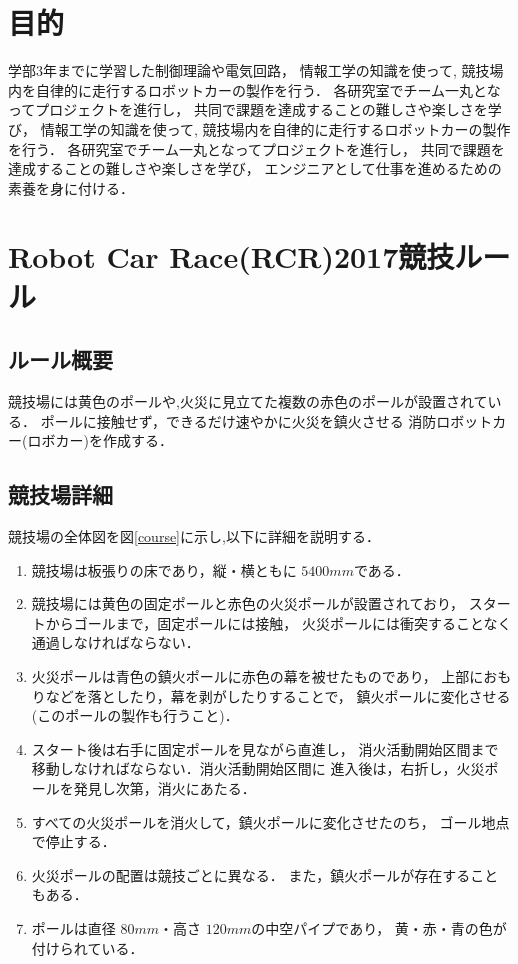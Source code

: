\documentclass[10pt,a4j]{jarticle}
\begin{document}



\newpage
\section{目的}
学部3年までに学習した制御理論や電気回路，
情報工学の知識を使って, 競技場内を自律的に走行するロボットカーの製作を行う．
各研究室でチーム一丸となってプロジェクトを進行し，
共同で課題を達成することの難しさや楽しさを学び，
情報工学の知識を使って, 競技場内を自律的に走行するロボットカーの製作を行う．
各研究室でチーム一丸となってプロジェクトを進行し，
共同で課題を達成することの難しさや楽しさを学び，
エンジニアとして仕事を進めるための素養を身に付ける．


\section{Robot Car Race(RCR)2017競技ルール}
\subsection{ルール概要}
競技場には黄色のポールや,火災に見立てた複数の赤色のポールが設置されている．
ポールに接触せず，できるだけ速やかに火災を鎮火させる
消防ロボットカー(ロボカー)を作成する．

\subsection{競技場詳細}
競技場の全体図を図\ref{course}に示し,以下に詳細を説明する．
\begin{enumerate}
  \item 競技場は板張りの床であり，縦・横ともに $5400\unit{mm}$である．

  \item 競技場には黄色の固定ポールと赤色の火災ポールが設置されており，
        スタートからゴールまで，固定ポールには接触，
        火災ポールには衝突することなく通過しなければならない．

  \item 火災ポールは青色の鎮火ポールに赤色の幕を被せたものであり，
        上部におもりなどを落としたり，幕を剥がしたりすることで，
        鎮火ポールに変化させる(このポールの製作も行うこと)．

  \item スタート後は右手に固定ポールを見ながら直進し，
        消火活動開始区間まで移動しなければならない．消火活動開始区間に
        進入後は，右折し，火災ポールを発見し次第，消火にあたる．

  \item すべての火災ポールを消火して，鎮火ポールに変化させたのち，
        ゴール地点で停止する．

  \item 火災ポールの配置は競技ごとに異なる．
        また，鎮火ポールが存在することもある．

  \item ポールは直径 $80\unit{mm}$・高さ $120\unit{mm}$の中空パイプであり，
        黄・赤・青の色が付けられている．
\end{enumerate}
\end{document}

